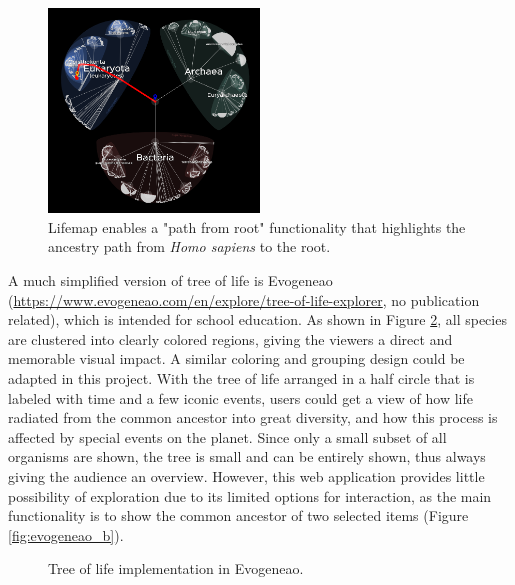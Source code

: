 \documentclass[11pt, a4paper,oneside,chapterprefix=false]{scrbook}
\begin{document}
\begin{figure}[h]
	\centering
	\includegraphics[width=0.5\textwidth]{figures/related_work/lifemap}
	\caption{Lifemap enables a "path from root" functionality that highlights the ancestry path from \textit{Homo sapiens} to the root. }
	\label{fig:lifemap}
\end{figure}

A much simplified version of tree of life is Evogeneao (\url{https://www.evogeneao.com/en/explore/tree-of-life-explorer}, no publication related), which is intended for school education. As shown in Figure \ref{fig:evogeneao}, all species are clustered into clearly colored regions, giving the viewers a direct and memorable visual impact. A similar coloring and grouping design could be adapted in this project. With the tree of life arranged in a half circle that is labeled with time and a few iconic events, users could get a view of how life radiated from the common ancestor into great diversity, and how this process is affected by special events on the planet. Since only a small subset of all organisms are shown, the tree is small and can be entirely shown, thus always giving the audience an overview. However, this web application provides little possibility of exploration due to its limited options for interaction, as the main functionality is to show the common ancestor of two selected items (Figure \ref{fig:evogeneao_b}).\\

\begin{figure}[h]
	\centering
	\hfill
	\caption{Tree of life implementation in Evogeneao. }
	\label{fig:evogeneao}
\end{figure}
\end{document}
